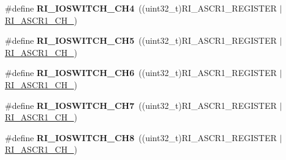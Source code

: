 \begin{DoxyCompactItemize}
\item 
\hypertarget{group___r_i___i_o_switch_ga9dcf19f166894f88b3a8251b69507e38}{\#define {\bfseries R\-I\-\_\-\-I\-O\-S\-W\-I\-T\-C\-H\-\_\-\-C\-H4}~((uint32\-\_\-t)R\-I\-\_\-\-A\-S\-C\-R1\-\_\-\-R\-E\-G\-I\-S\-T\-E\-R $\vert$ \hyperlink{group___peripheral___registers___bits___definition_ga3dec0b3bcfe7befb75a43f5573a56659}{R\-I\-\_\-\-A\-S\-C\-R1\-\_\-\-C\-H\-\_})}\label{group___r_i___i_o_switch_ga9dcf19f166894f88b3a8251b69507e38}

\item 
\hypertarget{group___r_i___i_o_switch_ga442259f099d470d4d9a0c5ba09b463d5}{\#define {\bfseries R\-I\-\_\-\-I\-O\-S\-W\-I\-T\-C\-H\-\_\-\-C\-H5}~((uint32\-\_\-t)R\-I\-\_\-\-A\-S\-C\-R1\-\_\-\-R\-E\-G\-I\-S\-T\-E\-R $\vert$ \hyperlink{group___peripheral___registers___bits___definition_ga2aca78076d819d0c1d1a3cbdce680d16}{R\-I\-\_\-\-A\-S\-C\-R1\-\_\-\-C\-H\-\_})}\label{group___r_i___i_o_switch_ga442259f099d470d4d9a0c5ba09b463d5}

\item 
\hypertarget{group___r_i___i_o_switch_ga5a163377be6198bd33637a0662150abe}{\#define {\bfseries R\-I\-\_\-\-I\-O\-S\-W\-I\-T\-C\-H\-\_\-\-C\-H6}~((uint32\-\_\-t)R\-I\-\_\-\-A\-S\-C\-R1\-\_\-\-R\-E\-G\-I\-S\-T\-E\-R $\vert$ \hyperlink{group___peripheral___registers___bits___definition_ga5baabbaf4ba016fe7038e4e1779f56d0}{R\-I\-\_\-\-A\-S\-C\-R1\-\_\-\-C\-H\-\_})}\label{group___r_i___i_o_switch_ga5a163377be6198bd33637a0662150abe}

\item 
\hypertarget{group___r_i___i_o_switch_ga69a240b7fad88239b88da259d960f1a4}{\#define {\bfseries R\-I\-\_\-\-I\-O\-S\-W\-I\-T\-C\-H\-\_\-\-C\-H7}~((uint32\-\_\-t)R\-I\-\_\-\-A\-S\-C\-R1\-\_\-\-R\-E\-G\-I\-S\-T\-E\-R $\vert$ \hyperlink{group___peripheral___registers___bits___definition_gafb20649c9e05d7a925346f863627bba2}{R\-I\-\_\-\-A\-S\-C\-R1\-\_\-\-C\-H\-\_})}\label{group___r_i___i_o_switch_ga69a240b7fad88239b88da259d960f1a4}

\item 
\hypertarget{group___r_i___i_o_switch_ga23a783c3facd7efd0092eae9c33fd7d6}{\#define {\bfseries R\-I\-\_\-\-I\-O\-S\-W\-I\-T\-C\-H\-\_\-\-C\-H8}~((uint32\-\_\-t)R\-I\-\_\-\-A\-S\-C\-R1\-\_\-\-R\-E\-G\-I\-S\-T\-E\-R $\vert$ \hyperlink{group___peripheral___registers___bits___definition_ga91d063f26cb508e8f8ecc6e4732410dc}{R\-I\-\_\-\-A\-S\-C\-R1\-\_\-\-C\-H\-\_})}\label{group___r_i___i_o_switch_ga23a783c3facd7efd0092eae9c33fd7d6}


\end{DoxyCompactItemize}
